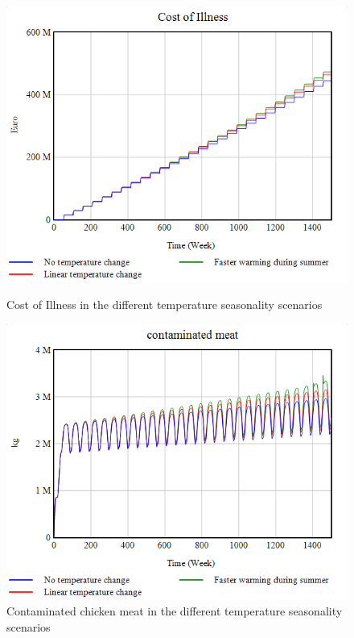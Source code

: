 \begin{figure}[h!]
    \centering
    \begin{minipage}{0.45\textwidth}
        \centering
        \includegraphics[width=1\textwidth]{images/sensitivity/Seasonal temperature COI.png} %
        \caption{Cost of Illness in the different temperature seasonality scenarios}
        \label{fig:season_coi}
    \end{minipage}\hfill
    \begin{minipage}{0.45\textwidth}
        \centering
        \includegraphics[width=1\textwidth]{images/sensitivity/Seasonal temperature contaminated meat.png} %
        \caption{Contaminated chicken meat in the different temperature seasonality scenarios}
        \label{fig:season_meat}
    \end{minipage}
\end{figure}

